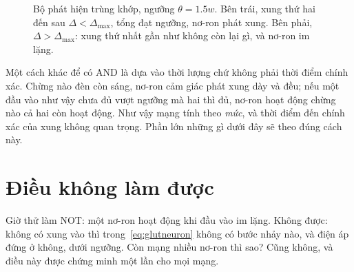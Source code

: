 \begin{figure}[t]
\centering
{}
\caption{Bộ phát hiện trùng khớp, ngưỡng $\theta=1.5w$. Bên trái, xung thứ hai đến sau $\Delta<\Delta_{\max}$, tổng đạt ngưỡng, nơ-ron phát xung. Bên phải, $\Delta>\Delta_{\max}$: xung thứ nhất gần như không còn lại gì, và nơ-ron im lặng.}
\label{fig:coincidence}
\end{figure}

Một cách khác để có AND là dựa vào thời lượng chứ không phải thời điểm chính xác. Chừng nào đèn còn sáng, nơ-ron cảm giác phát xung dày và đều; nếu một đầu vào như vậy chưa đủ vượt ngưỡng mà hai thì đủ, nơ-ron hoạt động chừng nào cả hai còn hoạt động. Như vậy mạng tính theo \emph{mức}, và thời điểm đến chính xác của xung không quan trọng. Phần lớn những gì dưới đây sẽ theo đúng cách này.

\section{Điều không làm được}

Giờ thử làm NOT: một nơ-ron hoạt động khi đầu vào im lặng. Không được: không có xung vào thì trong~\eqref{eq:glutneuron} không có bước nhảy nào, và điện áp đứng ở không, dưới ngưỡng. Còn mạng nhiều nơ-ron thì sao? Cũng không, và điều này được chứng minh một lần cho mọi mạng.

